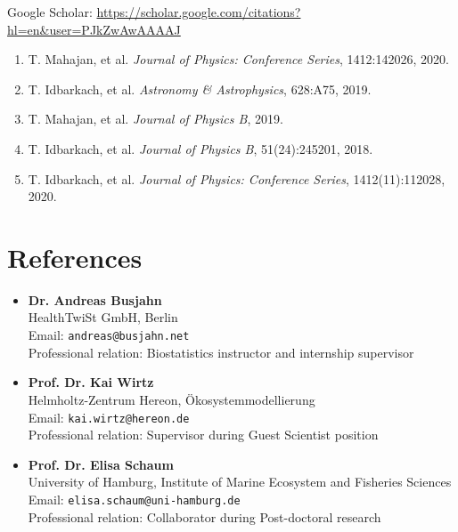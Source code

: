 \documentclass[margin,line,pifont,palatino,courier]{res}
\begin{document}
\begin{resume}
Google Scholar: \url{https://scholar.google.com/citations?hl=en&user=PJkZwAwAAAAJ}

\begin{enumerate}
\item T. Mahajan, et al. \textit{Journal of Physics: Conference Series}, 1412:142026, 2020.
\item T. Idbarkach, et al. \textit{Astronomy \& Astrophysics}, 628:A75, 2019.
\item T. Mahajan, et al. \textit{Journal of Physics B}, 2019.
\item T. Idbarkach, et al. \textit{Journal of Physics B}, 51(24):245201, 2018.
\item T. Idbarkach, et al. \textit{Journal of Physics: Conference Series}, 1412(11):112028, 2020.
\end{enumerate}

\section{\sc References}

\begin{itemize}
\item {\bf Dr. Andreas Busjahn}\\
HealthTwiSt GmbH, Berlin\\
Email: \texttt{andreas@busjahn.net}\\
Professional relation: Biostatistics instructor and internship supervisor

\item {\bf Prof. Dr. Kai Wirtz}\\
Helmholtz-Zentrum Hereon, \"Okosystemmodellierung\\
Email: \texttt{kai.wirtz@hereon.de}\\
Professional relation: Supervisor during Guest Scientist position

\item {\bf Prof. Dr. Elisa Schaum}\\
University of Hamburg, Institute of Marine Ecosystem and Fisheries Sciences\\
Email: \texttt{elisa.schaum@uni-hamburg.de}\\
Professional relation: Collaborator during Post-doctoral research
\end{itemize}

\end{resume}
\end{document}
